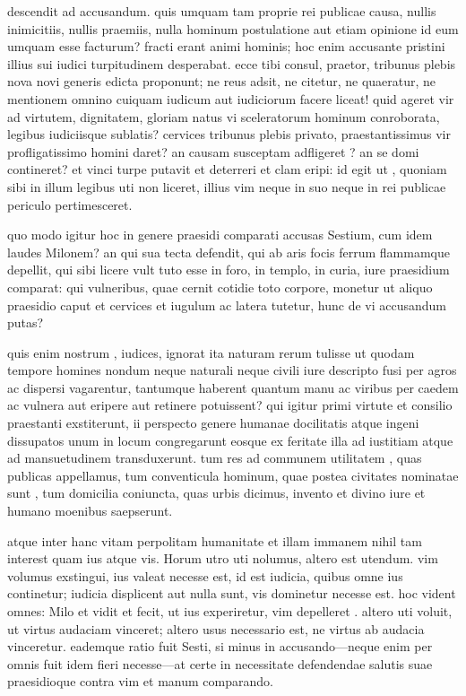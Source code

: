  descendit ad accusandum. quis umquam tam proprie rei publicae causa, nullis inimicitiis, nullis praemiis, nulla hominum postulatione aut etiam opinione id eum umquam esse facturum? fracti erant animi hominis; hoc enim accusante pristini illius sui iudici turpitudinem desperabat. ecce tibi consul, praetor, tribunus plebis nova novi generis edicta proponunt; ne reus adsit, ne citetur, ne quaeratur, ne mentionem omnino cuiquam iudicum aut iudiciorum facere liceat! quid ageret vir ad virtutem, dignitatem, gloriam natus vi sceleratorum hominum conroborata, legibus iudiciisque sublatis? cervices tribunus plebis privato, praestantissimus vir profligatissimo homini daret? an causam susceptam adfligeret ? an se domi contineret? et vinci turpe putavit et deterreri et clam eripi: id egit ut , quoniam sibi in illum legibus uti non liceret, illius vim neque in suo neque in rei publicae periculo pertimesceret.

 quo modo igitur hoc in genere praesidi comparati accusas Sestium, cum idem laudes Milonem? an qui sua tecta defendit, qui ab aris focis ferrum flammamque depellit, qui sibi licere vult tuto esse in foro, in templo, in curia, iure praesidium comparat: qui vulneribus, quae cernit cotidie toto corpore, monetur ut aliquo praesidio caput et cervices et iugulum ac latera tutetur, hunc de vi accusandum putas?

 quis enim nostrum , iudices, ignorat ita naturam rerum tulisse ut quodam tempore homines nondum neque naturali neque civili iure descripto fusi per agros ac dispersi vagarentur, tantumque haberent quantum manu ac viribus per caedem ac vulnera aut eripere aut retinere potuissent? qui igitur primi virtute et consilio praestanti exstiterunt, ii perspecto genere humanae docilitatis atque ingeni dissupatos unum in locum congregarunt eosque ex feritate illa ad iustitiam atque ad mansuetudinem transduxerunt. tum res ad communem utilitatem , quas publicas appellamus, tum conventicula hominum, quae postea civitates nominatae sunt , tum domicilia coniuncta, quas urbis dicimus, invento et divino iure et humano moenibus saepserunt.

 atque inter hanc vitam perpolitam humanitate et illam immanem nihil tam interest quam ius atque vis. Horum utro uti nolumus, altero est utendum. vim volumus exstingui, ius valeat necesse est, id est iudicia, quibus omne ius continetur; iudicia displicent aut nulla sunt, vis dominetur necesse est. hoc vident omnes: Milo et vidit et fecit, ut ius experiretur, vim depelleret . altero uti voluit, ut virtus audaciam vinceret; altero usus necessario est, ne virtus ab audacia vinceretur. eademque ratio fuit Sesti, si minus in accusando—neque enim per omnis fuit idem fieri necesse—at certe in necessitate defendendae salutis suae praesidioque contra vim et manum comparando.

